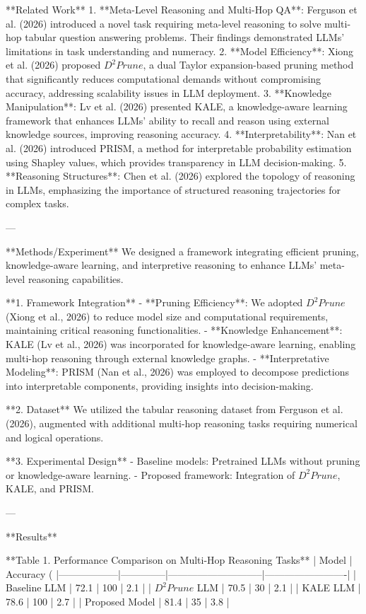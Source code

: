 **Related Work**  
1. **Meta-Level Reasoning and Multi-Hop QA**: Ferguson et al. (2026) introduced a novel task requiring meta-level reasoning to solve multi-hop tabular question answering problems. Their findings demonstrated LLMs’ limitations in task understanding and numeracy.  
2. **Model Efficiency**: Xiong et al. (2026) proposed $D^2Prune$, a dual Taylor expansion-based pruning method that significantly reduces computational demands without compromising accuracy, addressing scalability issues in LLM deployment.  
3. **Knowledge Manipulation**: Lv et al. (2026) presented KALE, a knowledge-aware learning framework that enhances LLMs’ ability to recall and reason using external knowledge sources, improving reasoning accuracy.  
4. **Interpretability**: Nan et al. (2026) introduced PRISM, a method for interpretable probability estimation using Shapley values, which provides transparency in LLM decision-making.  
5. **Reasoning Structures**: Chen et al. (2026) explored the topology of reasoning in LLMs, emphasizing the importance of structured reasoning trajectories for complex tasks.  

---

**Methods/Experiment**  
We designed a framework integrating efficient pruning, knowledge-aware learning, and interpretive reasoning to enhance LLMs’ meta-level reasoning capabilities.  

**1. Framework Integration**  
- **Pruning Efficiency**: We adopted $D^2Prune$ (Xiong et al., 2026) to reduce model size and computational requirements, maintaining critical reasoning functionalities.  
- **Knowledge Enhancement**: KALE (Lv et al., 2026) was incorporated for knowledge-aware learning, enabling multi-hop reasoning through external knowledge graphs.  
- **Interpretative Modeling**: PRISM (Nan et al., 2026) was employed to decompose predictions into interpretable components, providing insights into decision-making.  

**2. Dataset**  
We utilized the tabular reasoning dataset from Ferguson et al. (2026), augmented with additional multi-hop reasoning tasks requiring numerical and logical operations.  

**3. Experimental Design**  
- Baseline models: Pretrained LLMs without pruning or knowledge-aware learning.  
- Proposed framework: Integration of $D^2Prune$, KALE, and PRISM.  

---

**Results**  

**Table 1. Performance Comparison on Multi-Hop Reasoning Tasks**  
| Model            | Accuracy (%
|------------------|--------------|-----------------------------|-------------------------|  
| Baseline LLM     | 72.1         | 100                         | 2.1                     |  
| $D^2Prune$ LLM   | 70.5         | 30                          | 2.1                     |  
| KALE LLM         | 78.6         | 100                         | 2.7                     |  
| Proposed Model   | 81.4         | 35                          | 3.8                     |  

